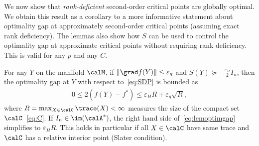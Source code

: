 \documentclass{article}
\newcommand{\1}{\mathbf{1}}
\begin{document}
We now show that \emph{rank-deficient} second-order critical points are globally optimal. We obtain this result as a corollary to a more informative statement about optimality gap at approximately second-order critical points (assuming exact rank deficiency). The lemmas also show how $S$ can be used to control the optimality gap at approximate critical points without requiring rank deficiency.
This is valid for any $p$ and any $C$.
\begin{lemma} \label{lem:optimgap}
	For any $Y$ on the manifold $\calM$, if $\|\grad f(Y)\| \leq \varepsilon_g$ and $S(Y) \succeq -\frac{\varepsilon_H}{2} I_n$, then the optimality gap at $Y$ with respect to~\eqref{eq:SDP} is bounded as
	\begin{align}
	0 \leq 2(f(Y) - f^*) \leq \varepsilon_H R + \varepsilon_g \sqrt{R},
	\label{eq:lemoptimgap}
	\end{align}
	where $R = \max_{X\in\calC} \trace(X) < \infty$ measures the size of the compact set $\calC$~\eqref{eq:C}.
	If $I_n\in\im(\calA^*)$,
	the right hand side of~\eqref{eq:lemoptimgap} simplifies to $\varepsilon_H R$. This holds in particular if all $X\in\calC$ have same trace and $\calC$ has a relative interior point (Slater condition).
\end{lemma}
\end{document}
